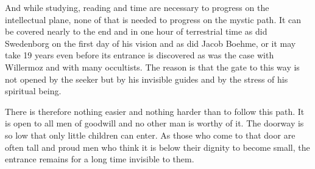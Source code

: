 And while studying, reading and time are necessary to progress on the intellectual
plane, none of that is needed to progress on the mystic path. It can be covered nearly to the
end and in one hour of terrestrial time as did Swedenborg on the first day of his vision and
as did Jacob Boehme, or it may take 19 years even before its entrance is discovered as was
the case with Willermoz and with many occultists. The reason is that the gate to this way is
not opened by the seeker but by his invisible guides and by the stress of his spiritual being.

There is therefore nothing easier and nothing harder than to follow this path. It is open
to all men of goodwill and no other man is worthy of it. The doorway is so low that only
little children can enter. As those who come to that door are often tall and proud men who
think it is below their dignity to become small, the entrance remains for a long time
invisible to them. 